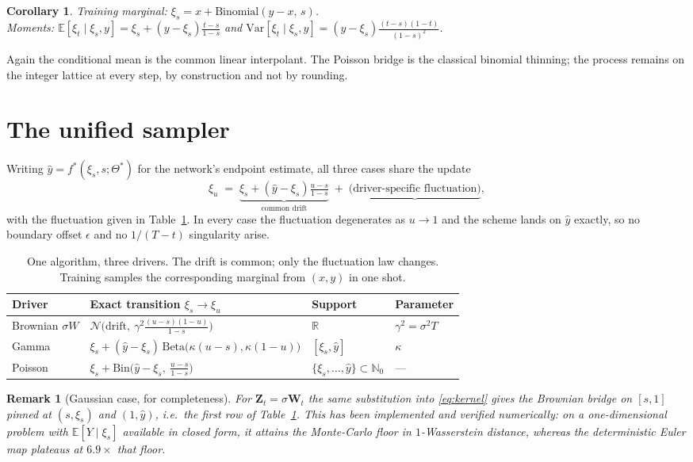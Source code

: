 \documentclass[11pt,a4paper]{article}
\newtheorem{coro}[prop]{Corollary}
\newtheorem{rem}[prop]{Remark}
\def\R{\mathbb{R}}
\def\N{\mathbb{N}}
\def\E{\mathbb{E}}
\def\Zb{\mathbf{Z}}
\begin{document}
\begin{coro}
Training marginal: $\xi_s=x+\mathrm{Binomial}(y-x,\,s)$. \\
Moments: $\E[\xi_t\mid\xi_s,y]=\xi_s+(y-\xi_s)\frac{t-s}{1-s}$ and
$\mathrm{Var}[\xi_t\mid\xi_s,y]=(y-\xi_s)\frac{(t-s)(1-t)}{(1-s)^2}$.
\end{coro}

Again the conditional mean is the common linear interpolant. The Poisson bridge is
the classical binomial thinning; the process remains on the integer lattice at every
step, by construction and not by rounding.

\section{The unified sampler}

Writing $\hat y = f^*(\xi_s,s;\Theta^*)$ for the network's endpoint estimate, all
three cases share the update
\begin{equation}
\label{eq:unified}
\xi_u \;=\; \underbrace{\xi_s+(\hat y-\xi_s)\tfrac{u-s}{1-s}}_{\text{common drift}}
\;+\;\underbrace{\text{(driver-specific fluctuation)}},
\end{equation}
with the fluctuation given in Table~\ref{tab:unified}. In every case the fluctuation
degenerates as $u\to1$ and the scheme lands on $\hat y$ exactly, so no boundary
offset $\epsilon$ and no $1/(T-t)$ singularity arise.

\begin{table}[h]
\centering
\begin{tabular}{llll}
\toprule
Driver & Exact transition $\xi_s\to\xi_u$ & Support & Parameter \\
\midrule
Brownian $\sigma W$ &
$\mathcal{N}\!\big(\text{drift},\ \gamma^2\frac{(u-s)(1-u)}{1-s}\big)$ &
$\R$ & $\gamma^2=\sigma^2T$ \\[3pt]
Gamma &
$\xi_s+(\hat y-\xi_s)\,\mathrm{Beta}\big(\kappa(u-s),\kappa(1-u)\big)$ &
$[\xi_s,\hat y]$ & $\kappa$ \\[3pt]
Poisson &
$\xi_s+\mathrm{Bin}\big(\hat y-\xi_s,\ \tfrac{u-s}{1-s}\big)$ &
$\{\xi_s,\dots,\hat y\}\subset\N_0$ & --- \\
\bottomrule
\end{tabular}
\caption{One algorithm, three drivers. The drift is common; only the fluctuation law
changes. Training samples the corresponding marginal from $(x,y)$ in one shot.}
\label{tab:unified}
\end{table}

\begin{rem}[Gaussian case, for completeness]
For $\Zb_t=\sigma\mathbf{W}_t$ the same substitution into \eqref{eq:kernel} gives the
Brownian bridge on $[s,1]$ pinned at $(s,\xi_s)$ and $(1,\hat y)$, i.e.\ the first row
of Table~\ref{tab:unified}. This has been implemented and verified numerically: on a
one-dimensional problem with $\E[Y\mid\xi_s]$ available in closed form, it attains the
Monte-Carlo floor in $1$-Wasserstein distance, whereas the deterministic Euler map
plateaus at $6.9\times$ that floor.
\end{rem}
\end{document}

